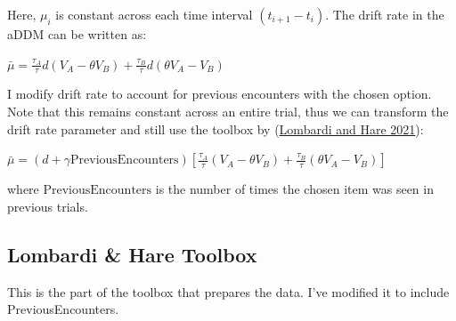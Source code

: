 \documentclass[
]{book}
\begin{document}
Here, \(\mu_i\) is constant across each time interval \((t_{i+1}-t_i)\). The drift rate in the aDDM can be written as:

\(\bar{\mu} = \frac{\tau_A}{\tau} d (V_A-\theta V_B) + \frac{\tau_B}{\tau} d (\theta V_A- V_B)\)

I modify drift rate to account for previous encounters with the chosen option. Note that this remains constant across an entire trial, thus we can transform the drift rate parameter and still use the toolbox by (\protect\hyperlink{ref-lombardi2021}{Lombardi and Hare 2021}):

\(\bar{\mu} = (d+\gamma \text{PreviousEncounters}) \left[ \frac{\tau_A}{\tau} (V_A-\theta V_B) + \frac{\tau_B}{\tau} (\theta V_A- V_B) \right]\)

where \(\text{PreviousEncounters}\) is the number of times the chosen item was seen in previous trials.

\hypertarget{lombardi-hare-toolbox}{%
\subsection{Lombardi \& Hare Toolbox}\label{lombardi-hare-toolbox}}

This is the part of the toolbox that prepares the data. I've modified it to include PreviousEncounters.
\end{document}
